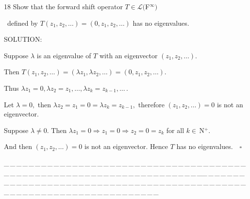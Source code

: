 \documentclass[a4paper, 11pt, UTF8]{article}
\def\Lm{\mathcal{L}}
\def\Nbp{$\,{\timesbf N}$^+}
\begin{document}
\begin{large}
{\timesbf\Large 18} {\timessl\Large 
Show that the forward shift operator $T\in\Lm(${\timesbf F}$^\infty)$}\par\quad\,
{\timessl\Large defined by $T(z_1,z_2,\dots) = (0, z_1,z_2,\dots)$ has no eigenvalues.
}\par
{\timesbf S\footnotesize{OLUTION:}}\par\quad
Suppose $\lambda$ is an eigenvalue of $T$ with an eigenvector $(z_1,z_2,\dots).$\par\quad
Then $T(z_1,z_2,\dots)=(\lambda z_1,\lambda z_2,\dots)=(0,z_1,z_2,\dots).$\par\quad
Thus $\lambda z_1=0,\lambda z_2=z_1,\dots,\lambda z_k=z_{k-1},\dots$\,.\par\quad
Let $\lambda=0,$ then $\lambda z_2=z_1=0=\lambda z_k=z_{k-1},$ therefore $(z_1,z_2,\dots)=0$ is not an eigenvector.\par\quad
Suppose $\lambda\neq 0$. Then $\lambda z_1=0\Rightarrow z_1=0\Rightarrow z_2=0=z_k$ for all $k\in\Nbp.$\par\quad
And then $(z_1,z_2,\dots)=0$ is not an eigenvector.
Hence $T$ has no eigenvalues.$\quad\square$\par
\par
{\tiny \_\,\_\,\_\,\_\,\_\,\_\,\_\,\_\,\_\,\_\,\_\,\_\,\_\,\_\,\_\,\_\,\_\,\_\,\_\,\_\,\_\,\_\,\_\,\_\,\_\,\_\,\_\,\_\,\_\,\_\,\_\,\_\,\_\,\_\,\_\,\_\,\_\,\_\,\_\,\_\,\_\,\_\,\_\,\_\,\_\,\_\,\_\,\_\,\_\,\_\,\_\,\_\,\_\,\_\,\_\,\_\,\_\,\_\,\_\,\_\,\_\,\_\,\_\,\_\,\_\,\_\,\_\,\_\,\_\,\_\,\_\_\,\_\,\_\,\_\,\_\,\_\,\_\,\_\,\_\,\_\,\_\,\_\,\_\,\_\,\_\,\_\,\_\,\_\,\_\,\_\,\_\,\_\,\_\,\_\,\_\,\_\,\_\,\_\,\_\,\_\,\_\,\_\,\_\,\_\,\_\,\_\,\_\,\_\,\_\,\_\,\_\,\_\,\_\,\_\,\_\,\_\,\_\,\_\,\_\,\_\,\_\,\_\,\_\,\_\,\_\,\_\,\_\,\_\,\_\,\_\,\_\,\_\,\_\,\_\,\_\,\_\,\_\,\_\,\_\,\_\,\_}\par


\end{large}
\end{document}
